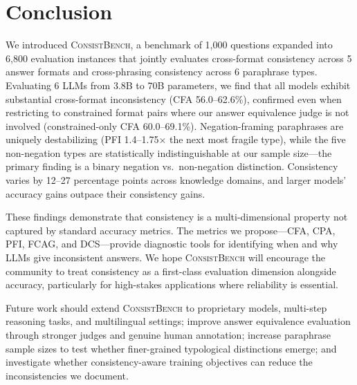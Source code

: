 \documentclass{article}
\newcommand{\consistbench}{\textsc{ConsistBench}}
\begin{document}
\section{Conclusion}
\label{sec:conclusion}

We introduced \consistbench{}, a benchmark of 1,000 questions expanded into 6,800 evaluation instances that jointly evaluates cross-format consistency across 5 answer formats and cross-phrasing consistency across 6 paraphrase types. Evaluating 6 LLMs from 3.8B to 70B parameters, we find that all models exhibit substantial cross-format inconsistency (CFA 56.0--62.6\%), confirmed even when restricting to constrained format pairs where our answer equivalence judge is not involved (constrained-only CFA 60.0--69.1\%). Negation-framing paraphrases are uniquely destabilizing (PFI 1.4--1.75$\times$ the next most fragile type), while the five non-negation types are statistically indistinguishable at our sample size---the primary finding is a binary negation vs.\ non-negation distinction. Consistency varies by 12--27 percentage points across knowledge domains, and larger models' accuracy gains outpace their consistency gains.

These findings demonstrate that consistency is a multi-dimensional property not captured by standard accuracy metrics. The metrics we propose---CFA, CPA, PFI, FCAG, and DCS---provide diagnostic tools for identifying when and why LLMs give inconsistent answers. We hope \consistbench{} will encourage the community to treat consistency as a first-class evaluation dimension alongside accuracy, particularly for high-stakes applications where reliability is essential.

Future work should extend \consistbench{} to proprietary models, multi-step reasoning tasks, and multilingual settings; improve answer equivalence evaluation through stronger judges and genuine human annotation; increase paraphrase sample sizes to test whether finer-grained typological distinctions emerge; and investigate whether consistency-aware training objectives can reduce the inconsistencies we document.


\end{document}
